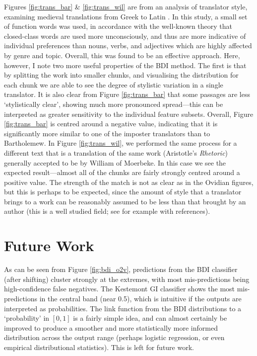 \documentclass[
    hf
]{ceurart}
\begin{document}
Figures \ref{fig:trans_bar} \& \ref{fig:trans_wil} are from an analysis of translator style,
examining medieval translations from Greek to Latin \cite{Beullens_Haverals_Nagy_2024}. In this
study, a small set of function words was used, in accordance with the well-known theory that
closed-class words are used more unconsciously, and thus are more indicative of individual
preferences than nouns, verbs, and adjectives which are highly affected by genre and topic. Overall,
this was found to be an effective approach. Here, however, I note two more useful properties of the
BDI method. The first is that by splitting the work into smaller chunks, and visualising the
distribution for each chunk we are able to see the degree of stylistic variation in a single
translator. It is also clear from Figure \ref{fig:trans_bar} that some passages are less
`stylistically clear', showing much more pronounced spread---this can be interpreted as greater
sensitivity to the individual feature subsets. Overall, Figure \ref{fig:trans_bar} is centred around
a negative value, indicating that it is significantly more similar to one of the imposter
translators than to Bartholemew. In Figure \ref{fig:trans_wil}, we performed the same process for a
different text that is a translation of the same work (Aristotle's \emph{Rhetoric}) generally
accepted to be by William of Moerbeke. In this case we see the expected result---almost all of the
chunks are fairly strongly centred around a positive value. The strength of the match is not as
clear as in the Ovidian figures, but this is perhaps to be expected, since the amount of style that
a translator brings to a work can be reasonably assumed to be less than that brought by an author
(this is a well studied field; see for example \cite{rybicki2012great} with references).

\section{Future Work}

As can be seen from Figure \ref{fig:bdi_o2v}, predictions from the BDI classifier (after shifting)
cluster strongly at the extremes, with most mis-predictions being high-confidence false negatives.
The Kestemont GI classifier shows the most mis-predictions in the central band (near 0.5), which is
intuitive if the outputs are interpreted as probabilities. The link function from the BDI
distributions to a `probability' in $[0,1]$ is a fairly simple idea, and can almost certainly be
improved to produce a smoother and more statistically more informed distribution across the output
range (perhaps logistic regression, or even empirical distributional statistics). This is left for
future work.
\end{document}
